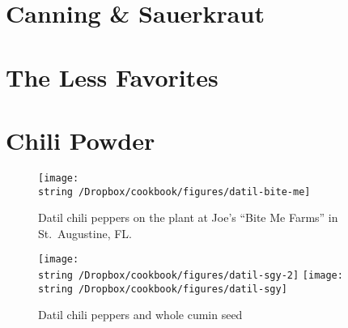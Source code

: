\documentclass[12pt, final]{book}
\begin{document}
\chapter{Canning \& Sauerkraut}

\newpage

\newpage
\chapter{The Less Favorites}\label{chapter3}

\newpage

\newpage

\newpage

\newpage

\newpage

\newpage

\newpage

\newpage

\newpage

\newpage

\chapter{Chili Powder}








\begin{figure}
\begin{center}
\texttt{[image: \\string~/Dropbox/cookbook/figures/datil-bite-me]}
\end{center}
\caption*{Datil chili peppers on the plant at Joe's ``Bite Me Farms'' in St.\ Augustine, FL.}
\end{figure}
\begin{figure}
\begin{center}
\texttt{[image: \\string~/Dropbox/cookbook/figures/datil-sgy-2]}
\texttt{[image: \\string~/Dropbox/cookbook/figures/datil-sgy]}
\end{center}
\caption*{Datil chili peppers and whole cumin seed}
\end{figure}
\end{document}
